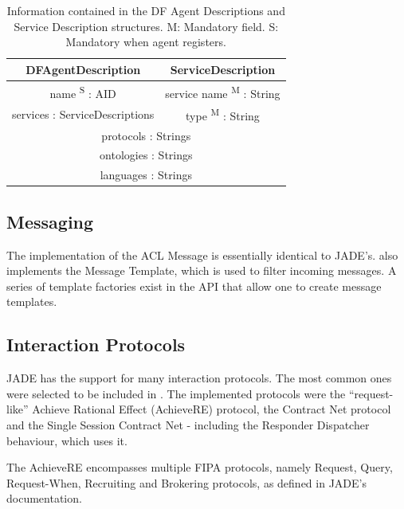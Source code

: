 \begin{table}
	\normalsize
	\caption[The DF Agent Descriptions and the Service Description]{Information contained in the DF Agent Descriptions and Service Description structures.
	M: Mandatory field. S: Mandatory when agent registers.}
	\label{tab:dfAgentDescription}
	\begin{center}
		\begin{tabular}{c|c}
		\hline
		\textbf{DFAgentDescription} & \textbf{ServiceDescription} \\
		\hline
		name \textsuperscript{S} : AID & service name \textsuperscript{M} : String \\
		\hline
		services : ServiceDescriptions & type \textsuperscript{M} : String \\
		\hline
		\multicolumn{2}{c}{protocols : Strings} \\
		\hline
		\multicolumn{2}{c}{ontologies : Strings} \\
		\hline
		\multicolumn{2}{c}{languages : Strings} \\
		\hline
		\end{tabular}
	\end{center}
\end{table} 

\subsection{Messaging}
The implementation of the ACL Message is essentially identical to JADE's. \apiname{} also implements the Message Template, which is used to filter incoming messages. A series of template factories exist in the API that allow one to create message templates. 

\subsection{Interaction Protocols}
JADE has the support for many interaction protocols. The most common ones were selected to be included in \apiname{}.
The implemented protocols were the ``request-like'' Achieve Rational Effect (AchieveRE) protocol, the Contract Net protocol and the Single Session Contract Net - including the Responder Dispatcher behaviour, which uses it.

The AchieveRE encompasses multiple FIPA protocols, namely Request, Query, Request-When, Recruiting and Brokering protocols, as defined in JADE's documentation.

